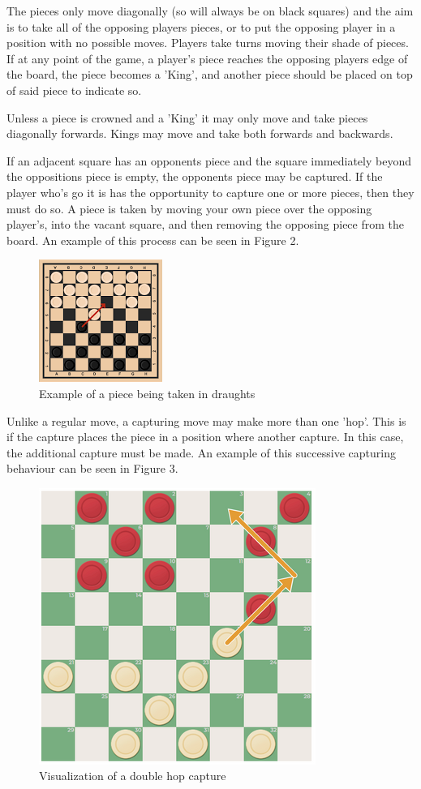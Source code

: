 \documentclass{article}
\begin{document}
    The pieces only move diagonally (so will always be on black squares)
    and the aim is to take all of the opposing players pieces, or to put the opposing player in a position with no possible moves.
    Players take turns moving their shade of pieces. If at any point of the game, a player's piece reaches the opposing players edge
    of the board, the piece becomes a 'King', and another piece should be placed on top of said piece to indicate so.

    Unless a piece is crowned and a 'King' it may only move and take pieces diagonally forwards. Kings may move and take both forwards and backwards.

    If an adjacent square has an opponents piece and the square immediately beyond the oppositions piece is empty, the opponents piece may be captured.
    If the player who's go it is has the opportunity to capture one or more pieces, then they must do so. 
    A piece is taken by moving your own piece over the opposing player's, into the vacant square, and then removing the opposing piece from the board.
    An example of this process can be seen in Figure 2.

    \begin{figure}[h]
        \centering
        \includegraphics[scale=1.15]{piece being taken.png}
        \caption{Example of a piece being taken in draughts}
    \end{figure}

    Unlike a regular move, a capturing move may make more than one 'hop'. This is if the capture places the piece in a position where another capture.
    In this case, the additional capture must be made. An example of this successive capturing behaviour can be seen in Figure 3. 
    
    \begin{figure}[h]
        \centering
        \includegraphics[scale=0.8]{double hop.png}
        \caption{Visualization of a double hop capture}
    \end{figure}
\end{document}
